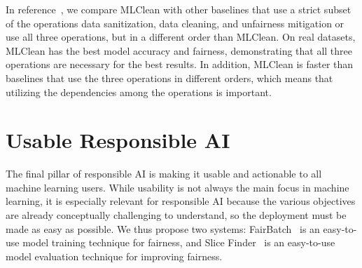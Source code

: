 \documentclass[11pt]{article}
\newcommand{\fb}{FairBatch}
\newcommand{\mc}{MLClean}
\newcommand{\slicefinder}{Slice Finder}
\begin{document}


In reference~\cite{DBLP:conf/sigmod/TaeROKW19}, we compare \mc{} with other baselines that use a strict subset of the operations data sanitization, data cleaning, and unfairness mitigation or use all three operations, but in a different order than \mc{}. On real datasets, \mc{} has the best model accuracy and fairness, demonstrating that all three operations are necessary for the best results. In addition, \mc{} is faster than baselines that use the three operations in different orders, which means that utilizing the dependencies among the operations is important.


\section{Usable Responsible AI}
\label{sec:usability}

The final pillar of responsible AI is making it usable and actionable to all machine learning users. While usability is not always the main focus in machine learning, it is especially relevant for responsible AI because the various objectives are already conceptually challenging to understand, so the deployment must be made as easy as possible.
We thus propose two systems: \fb{}~\cite{fairbatch} is an easy-to-use model training technique for fairness, and \slicefinder{}~\cite{DBLP:conf/icde/ChungKPTW19,DBLP:journals/tkde/ChungKPTW20} is an easy-to-use model evaluation technique for improving fairness.
\end{document}
